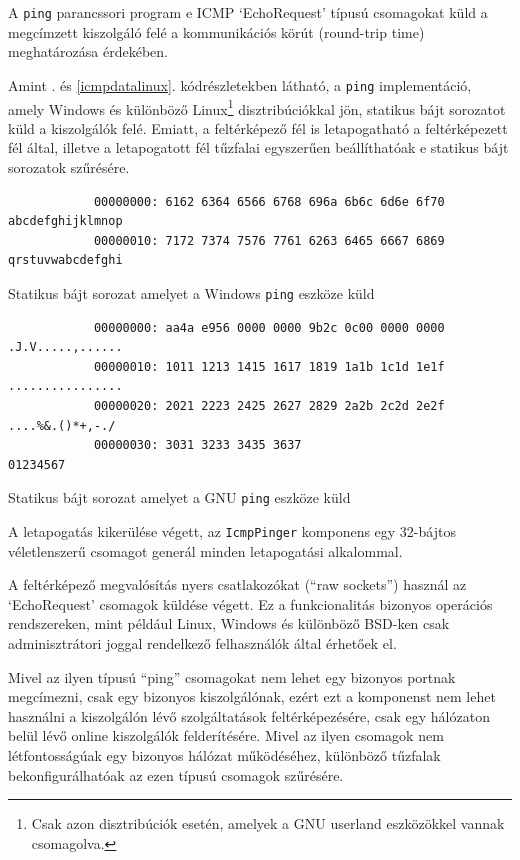 	A \texttt{ping} parancssori program e ICMP `EchoRequest' típusú csomagokat küld a megcímzett kiszolgáló felé a kommunikációs körút (round-trip time) meghatározása érdekében.
	
	Amint \az{\ref{icmpdatawindows}}. és \ref{icmpdatalinux}. kódrészletekben látható, a \texttt{ping} implementáció, amely Windows és különböző Linux\footnote{Csak azon disztribúciók esetén, amelyek a GNU userland eszközökkel vannak csomagolva.} disztribúciókkal jön, statikus bájt sorozatot küld a kiszolgálók felé. Emiatt, a feltérképező fél is letapogatható a feltérképezett fél által, illetve a letapogatott fél tűzfalai egyszerűen beállíthatóak e statikus bájt sorozatok szűrésére.
	
	\begin{listing}[H]
		\begin{verbatim}
			00000000: 6162 6364 6566 6768 696a 6b6c 6d6e 6f70  abcdefghijklmnop
			00000010: 7172 7374 7576 7761 6263 6465 6667 6869  qrstuvwabcdefghi
		\end{verbatim}
		\caption{Statikus bájt sorozat amelyet a Windows \texttt{ping} eszköze küld}
		\label{icmpdatawindows}
	\end{listing}
	
	\begin{listing}[H]
		\begin{verbatim}
			00000000: aa4a e956 0000 0000 9b2c 0c00 0000 0000  .J.V.....,......
			00000010: 1011 1213 1415 1617 1819 1a1b 1c1d 1e1f  ................
			00000020: 2021 2223 2425 2627 2829 2a2b 2c2d 2e2f   ....%&.()*+,-./
			00000030: 3031 3233 3435 3637                      01234567
		\end{verbatim}
		\caption{Statikus bájt sorozat amelyet a GNU \texttt{ping} eszköze küld}
		\label{icmpdatalinux}
	\end{listing}
	
	A letapogatás kikerülése végett, az \texttt{IcmpPinger} komponens egy 32-bájtos véletlenszerű csomagot generál minden letapogatási alkalommal.
	
	A feltérképező megvalósítás nyers csatlakozókat (``raw sockets'') használ az `EchoRequest' csomagok küldése végett. Ez a funkcionalitás bizonyos operációs rendszereken, mint például Linux, Windows és különböző BSD-ken csak adminisztrátori joggal rendelkező felhasználók által érhetőek el.

	Mivel az ilyen típusú ``ping'' csomagokat nem lehet egy bizonyos portnak megcímezni, csak egy bizonyos kiszolgálónak, ezért ezt a komponenst nem lehet használni a kiszolgálón lévő szolgáltatások feltérképezésére, csak egy hálózaton belül lévő online kiszolgálók felderítésére. Mivel az ilyen csomagok nem létfontosságúak egy bizonyos hálózat működéséhez, különböző tűzfalak bekonfigurálhatóak az ezen típusú csomagok szűrésére.

